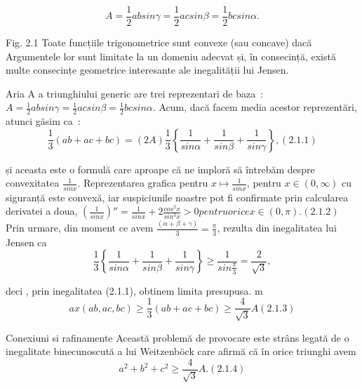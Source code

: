 \documentclass[a4paper,12pt,oneside]{report}
\begin{document}
\begin{displaymath}
  A = \frac{1}{2}ab sin\gamma = \frac{1}{2}ac sin \beta = \frac{1}{2}bc sin \alpha. 
\end{displaymath}


Fig. 2.1 Toate funcțiile trigonometrice sunt convexe (sau concave) dacă
Argumentele lor sunt limitate la un domeniu adecvat și, în consecință,
există multe consecințe geometrice interesante ale inegalității lui Jensen.

Aria A a triunghiului generic are trei reprezentari de baza :
\(A = \frac{1}{2}ab sin\gamma = \frac{1}{2}ac sin \beta = \frac{1}{2}bc sin \alpha. \)
Acum, dacă facem media acestor reprezentări, atunci găsim ca :
\begin{displaymath}
  \frac{1}{3}\left ( ab + ac + bc \right )= \left ( 2A \right )\frac{1}{3}\left \{ \frac{1}{sin \alpha } + \frac{1}{sin \beta } + \frac{1}{sin \gamma }\right \}, (2.1.1)
\end{displaymath}

și aceasta este o formulă care aproape că ne imploră să întrebăm despre convexitatea \(\frac{1}{sin x}\). Reprezentarea grafica pentru \(x \mapsto \frac{1}{sin x}\), pentru \(x\in \left ( 0 , \infty  \right )\) cu siguranță este convexă, iar suspiciunile noastre pot fi confirmate prin calcularea derivatei a doua, \({\left ( \frac{1}{sin x} \right )}''= \frac{1}{sin x} + 2\frac{cos^{2}x}{sin ^{3}x}> 0 pentru orice x\in \left ( 0, \pi  \right ) . (2.1.2)\)
	Prin urmare, din moment ce avem \(\frac{\left ( \alpha + \beta  + \gamma  \right )}{3}= \frac{\pi }{3}\), rezulta din inegalitatea lui Jensen ca 
\begin{displaymath}
  \frac{1}{3}\left \{ \frac{1}{sin \alpha }  + \frac{1}{sin \beta } + \frac{1}{sin \gamma }\right \}\geq \frac{1}{sin \frac{\pi }{3}} =  \frac{2}{\sqrt{3}}, 
\end{displaymath}

deci , prin inegalitatea (2.1.1), obtinem limita presupusa. 
m\begin{displaymath}
  ax \left ( ab, ac, bc \right )\geq \frac{1}{3}\left ( ab + ac + bc \right )\geq \frac{4}{\sqrt{3}}A ( 2.1.3) 
\end{displaymath}

Conexiuni si rafinamente 
Această problemă de provocare este strâns legată de o inegalitate binecunoscută a lui Weitzenböck care afirmă că în orice triunghi avem 
\begin{displaymath}
  a^{2} + b^{2} + c^{2} \geq \frac{4}{\sqrt{3}}A . (2.1.4)
\end{displaymath}
\end{document}
